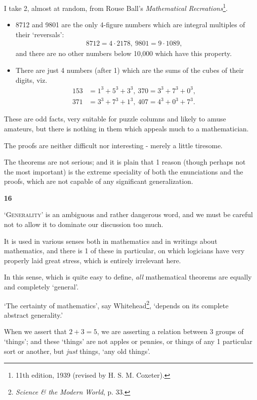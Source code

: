 \documentclass{article}
\numberwithin{equation}{section}
\begin{document}
I take 2, almost at random, from Rouse Ball's \textit{Mathematical Recreations}\footnote{11th edition, 1939 (revised by H. S. M. Coxeter).}.
\begin{itemize}
    \item[(a)] 8712 and 9801 are the only 4-figure numbers which are integral multiples of their `reversals':
    \begin{align*}
        8712 = 4\cdot2178,\ 9801 = 9\cdot1089,
    \end{align*}
    and there are no other numbers below 10,000 which have this property.
    \item[(b)] There are just 4 numbers (after 1) which are the sums of the cubes of their digits, viz.
    \begin{align*}
        153 &= 1^3 + 5^3 + 3^3,\ 370 = 3^3 + 7^3 + 0^3,\\
        371 &= 3^3 + 7^3 + 1^3,\ 407 = 4^3 + 0^3 + 7^3.
    \end{align*}
\end{itemize}
These are odd facts, very suitable for puzzle columns and likely to amuse amateurs, but there is nothing in them which appeals much to a mathematician.

The proofs are neither difficult nor interesting - merely a little tiresome.

The theorems are not serious; and it is plain that 1 reason (though perhaps not the most important) is the extreme speciality of both the enunciations and the proofs, which are not capable of any significant generalization.

\begin{center}
    \large\textbf{16}
\end{center}
\textsc{`Generality'} is an ambiguous and rather dangerous word, and we must be careful not to allow it to dominate our discussion too much.

It is used in various senses both in mathematics and in writings about mathematics, and there is 1 of these in particular, on which logicians have very properly laid great stress, which is entirely irrelevant here.

In this sense, which is quite easy to define, \textit{all} mathematical theorems are equally and completely `general'.

%
`The certainty of mathematics', say Whitehead\footnote{\textit{Science \& the Modern World}, p. 33.}, `depends on its complete abstract generality.'

When we assert that $2 + 3 = 5$, we are asserting a relation between 3 groups of `things'; and these `things' are not apples or pennies, or things of any 1 particular sort or another, but \textit{just} things, `any old things'.
\end{document}

